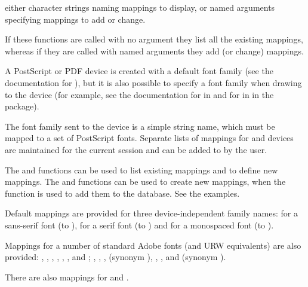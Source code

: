 %
\begin{Arguments}
\begin{ldescription}
\item[\code{...}] either character strings naming mappings to display,
or named arguments specifying mappings to add or change.
\end{ldescription}
\end{Arguments}
%
\begin{Details}\relax
If these functions are called with no argument they list all the
existing mappings, whereas if they are called with named arguments
they add (or change) mappings.

A PostScript or PDF device is created with a default font family (see the
documentation for ), but it is also possible
to specify a font family when drawing to the device (for example, see
the documentation for  in  and for
 in  in the  package).

The font family sent to the device is a simple string name, which must be
mapped to a set of PostScript fonts.  Separate lists of mappings for
 and  devices are  maintained for the
current \R{} session and can be added to by the user.

The  and  functions can be used
to list existing mappings and to define new mappings.  The
 and  functions can be
used to create new mappings, when the  function is used
to add them to the database.  See the examples.

Default mappings are provided for three device-independent family
names:  for a sans-serif font (to ),
 for a serif font (to ) and 
for a monospaced font (to ).

Mappings for a number of standard Adobe fonts (and URW equivalents)
are also provided: ,
, , ,
, ,
 and ;
, , ,
 (synonym ),
, ,  and
 (synonym ).

There are also mappings for  and
.


\end{Details}
